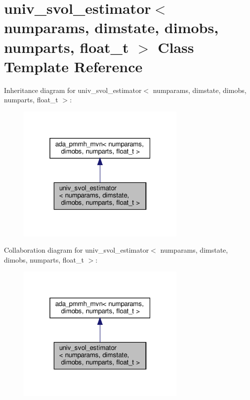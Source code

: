 \hypertarget{classuniv__svol__estimator}{}\section{univ\+\_\+svol\+\_\+estimator$<$ numparams, dimstate, dimobs, numparts, float\+\_\+t $>$ Class Template Reference}
\label{classuniv__svol__estimator}


Inheritance diagram for univ\+\_\+svol\+\_\+estimator$<$ numparams, dimstate, dimobs, numparts, float\+\_\+t $>$\+:\nopagebreak
\begin{figure}[H]
\begin{center}
\leavevmode
\includegraphics[width=232pt]{classuniv__svol__estimator__inherit__graph}
\end{center}
\end{figure}


Collaboration diagram for univ\+\_\+svol\+\_\+estimator$<$ numparams, dimstate, dimobs, numparts, float\+\_\+t $>$\+:\nopagebreak
\begin{figure}[H]
\begin{center}
\leavevmode
\includegraphics[width=232pt]{classuniv__svol__estimator__coll__graph}
\end{center}
\end{figure}
